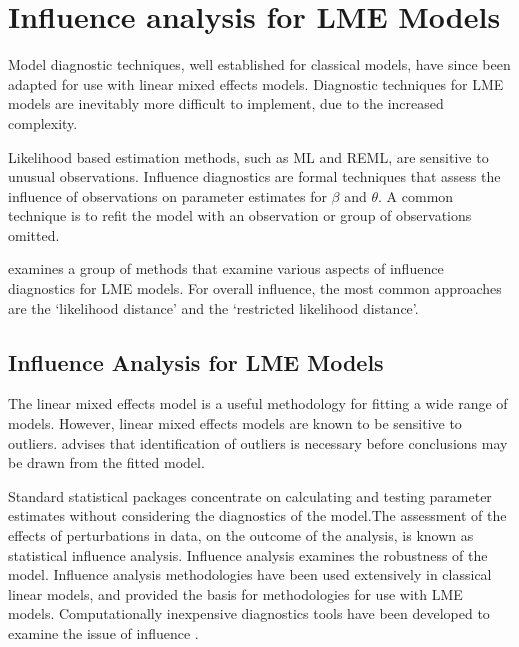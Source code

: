 \documentclass[Main.tex]{subfiles}
\begin{document}
\newpage



			\section{Influence analysis for LME Models} %

				
				Model diagnostic techniques, well established for classical models, have since been adapted for use with linear mixed effects models. Diagnostic techniques for LME models are inevitably more difficult to implement, due to the increased complexity.
					
			Likelihood based estimation methods, such as ML and REML, are sensitive to unusual observations. Influence diagnostics are formal techniques that assess the influence of observations on parameter estimates for $\beta$ and $\theta$. A common technique is to refit the model with an observation or group of observations omitted.
			
			\citet{west} examines a group of methods that examine various aspects of influence diagnostics for LME models.
			For overall influence, the most common approaches are the `likelihood distance' and the `restricted likelihood distance'.
			
	
	\subsection{Influence Analysis for LME Models} %
	The linear mixed effects model is a useful methodology for fitting a wide range of models. However, linear mixed effects models are known to be sensitive to outliers. \citet{CPJ} advises that identification of outliers is necessary before conclusions may be drawn from the fitted model.
	
	Standard statistical packages concentrate on calculating and testing parameter estimates without considering the diagnostics of the model.The assessment of the effects of perturbations in data, on the outcome of the analysis, is known as statistical influence analysis. Influence analysis examines the robustness of the model. Influence analysis methodologies have been used extensively in classical linear models, and provided the basis for methodologies for use with LME models.
	Computationally inexpensive diagnostics tools have been developed to examine the issue of influence \citep{Zewotir}.
		
\end{document}
